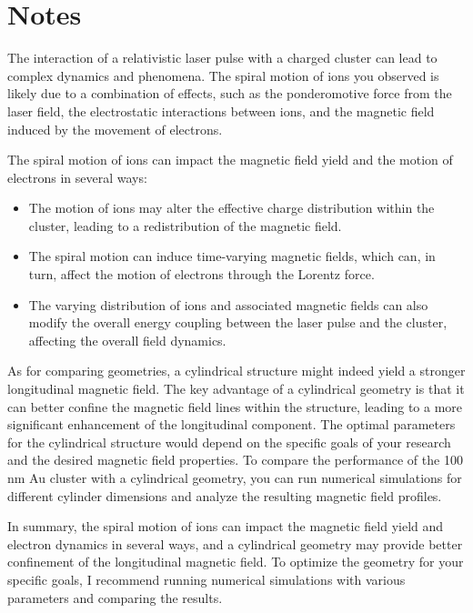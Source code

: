 \section{Notes}

The interaction of a relativistic laser pulse with a charged cluster can lead to complex dynamics and phenomena. The spiral motion of ions you observed is likely due to a combination of effects, such as the ponderomotive force from the laser field, the electrostatic interactions between ions, and the magnetic field induced by the movement of electrons.

The spiral motion of ions can impact the magnetic field yield and the motion of electrons in several ways:

\begin{itemize}
    \item The motion of ions may alter the effective charge distribution within the cluster, leading to a redistribution of the magnetic field.
    \item The spiral motion can induce time-varying magnetic fields, which can, in turn, affect the motion of electrons through the Lorentz force.
    \item The varying distribution of ions and associated magnetic fields can also modify the overall energy coupling between the laser pulse and the cluster, affecting the overall field dynamics.
\end{itemize}

As for comparing geometries, a cylindrical structure might indeed yield a stronger longitudinal magnetic field. The key advantage of a cylindrical geometry is that it can better confine the magnetic field lines within the structure, leading to a more significant enhancement of the longitudinal component. The optimal parameters for the cylindrical structure would depend on the specific goals of your research and the desired magnetic field properties. To compare the performance of the 100 nm Au cluster with a cylindrical geometry, you can run numerical simulations for different cylinder dimensions and analyze the resulting magnetic field profiles.

In summary, the spiral motion of ions can impact the magnetic field yield and electron dynamics in several ways, and a cylindrical geometry may provide better confinement of the longitudinal magnetic field. To optimize the geometry for your specific goals, I recommend running numerical simulations with various parameters and comparing the results.

